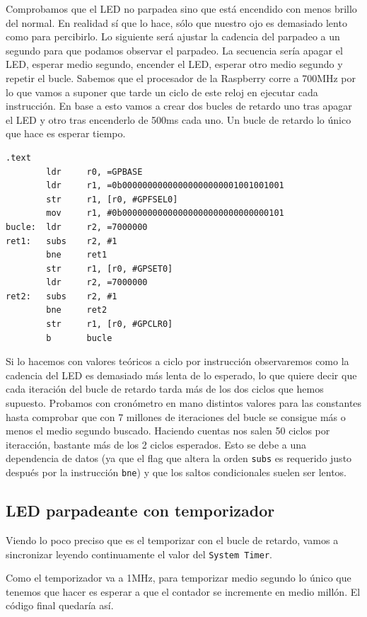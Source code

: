 Comprobamos que el LED no parpadea sino que está encendido con menos brillo del normal.
En realidad sí que lo hace, sólo que nuestro ojo es demasiado lento como para percibirlo.
Lo siguiente será ajustar la cadencia del parpadeo a un segundo para que podamos observar
el parpadeo. La secuencia sería apagar el LED, esperar medio segundo, encender el LED,
esperar otro medio segundo y repetir el bucle. Sabemos que el procesador de la Raspberry
corre a 700MHz por lo que vamos a suponer que tarde un ciclo de este reloj en ejecutar
cada instrucción. En base a esto vamos a crear dos bucles de retardo uno tras apagar el LED
y otro tras encenderlo de 500ms cada uno. Un bucle de retardo lo único que hace es esperar
tiempo. 

\begin{lstlisting}[caption={Parte de esbn4.s},label={lst:codigoPract4_4}]
.text
        ldr     r0, =GPBASE
        ldr     r1, =0b00000000000000000000001001001001
        str     r1, [r0, #GPFSEL0]
        mov     r1, #0b00000000000000000000000000000101
bucle:  ldr     r2, =7000000
ret1:   subs    r2, #1
        bne     ret1
        str     r1, [r0, #GPSET0]
        ldr     r2, =7000000
ret2:   subs    r2, #1
        bne     ret2
        str     r1, [r0, #GPCLR0]
        b       bucle
\end{lstlisting}

Si lo hacemos con valores teóricos a ciclo por instrucción observaremos como la cadencia del
LED es demasiado más lenta de lo esperado, lo que quiere decir que cada iteración del bucle
de retardo tarda más de los dos ciclos que hemos supuesto.
Probamos con cronómetro en mano distintos valores para las constantes hasta comprobar que con
7 millones de iteraciones del bucle se consigue más o menos el medio segundo buscado. Haciendo
cuentas nos salen 50 ciclos por iteracción, bastante más de los 2 ciclos esperados. Esto se
debe a una dependencia de datos (ya que el flag que altera
la orden {\tt subs} es requerido justo después por la instrucción {\tt bne}) y que los saltos
condicionales suelen ser lentos.

\subsection{LED parpadeante con temporizador}

Viendo lo poco preciso que es el temporizar con el bucle de retardo, vamos a sincronizar leyendo
continuamente el valor del {\tt System Timer}.

Como el temporizador va a 1MHz, para temporizar medio segundo lo
único que tenemos que hacer es esperar a que el contador se incremente en medio millón. El código
final quedaría así.

